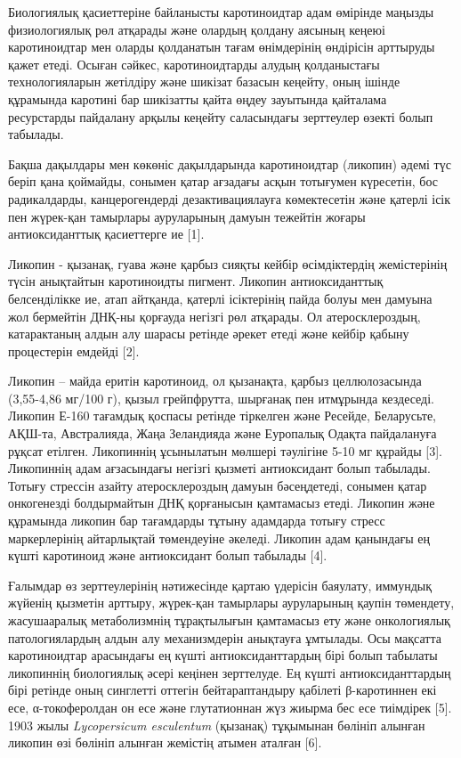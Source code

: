 Биологиялық қасиеттеріне байланысты каротиноидтар адам өмірінде маңызды
физиологиялық рөл атқарады және олардың қолдану аясының кеңеюі
каротиноидтар мен оларды қолданатын тағам өнімдерінің өндірісін
арттыруды қажет етеді. Осыған сәйкес, каротиноидтарды алудың
қолданыстағы технологияларын жетілдіру және шикізат базасын кеңейту,
оның ішінде құрамында каротині бар шикізатты қайта өңдеу зауытында
қайталама ресурстарды пайдалану арқылы кеңейту саласындағы зерттеулер
өзекті болып табылады.

Бақша дақылдары мен көкөніс дақылдарында каротиноидтар (ликопин) әдемі
түс беріп қана қоймайды, сонымен қатар ағзадағы асқын тотығумен
күресетін, бос радикалдарды, канцерогендерді дезактивациялауға
көмектесетін және қатерлі ісік пен жүрек-қан тамырлары ауруларының
дамуын тежейтін жоғары антиоксиданттық қасиеттерге ие {[}1{]}.

Ликопин - қызанақ, гуава және қарбыз сияқты кейбір өсімдіктердің
жемістерінің түсін анықтайтын каротиноидты пигмент. Ликопин
антиоксиданттық белсенділікке ие, атап айтқанда, қатерлі ісіктерінің
пайда болуы мен дамуына жол бермейтін ДНҚ-ны қорғауда негізгі рөл
атқарады. Ол атеросклероздың, катарактаның алдын алу шарасы ретінде
әрекет етеді және кейбір қабыну процестерін емдейді {[}2{]}.

Ликопин -- майда еритін каротиноид, ол қызанақта, қарбыз целлюлозасында
(3,55-4,86 мг/100 г), қызыл грейпфрутта, шырғанақ пен итмұрында
кездеседі. Ликопин Е-160 тағамдық қоспасы ретінде тіркелген және
Ресейде, Беларусьте, АҚШ-та, Австралияда, Жаңа Зеландияда және Еуропалық
Одақта пайдалануға рұқсат етілген. Ликопиннің ұсынылатын мөлшері
тәулігіне 5-10 мг құрайды {[}3{]}. Ликопиннің адам ағзасындағы негізгі
қызметі антиоксидант болып табылады. Тотығу стрессін азайту
атеросклероздың дамуын бәсеңдетеді, сонымен қатар онкогенезді
болдырмайтын ДНҚ қорғанысын қамтамасыз етеді. Ликопин және құрамында
ликопин бар тағамдарды тұтыну адамдарда тотығу стресс маркерлерінің
айтарлықтай төмендеуіне әкеледі. Ликопин адам қанындағы ең күшті
каротиноид және антиоксидант болып табылады {[}4{]}.

Ғалымдар өз зерттеулерінің нәтижесінде қартаю үдерісін баяулату,
иммундық жүйенің қызметін арттыру, жүрек-қан тамырлары ауруларының
қаупін төмендету, жасушааралық метаболизмнің тұрақтылығын қамтамасыз ету
және онкологиялық патологиялардың алдын алу механизмдерін анықтауға
ұмтылады. Осы мақсатта каротиноидтар арасындағы ең күшті
антиоксиданттардың бірі болып табылаты ликопиннің биологиялық әсері
кеңінен зерттелуде. Ең күшті антиоксиданттардың бірі ретінде оның
синглетті оттегін бейтараптандыру қабілеті β-каротиннен екі есе,
α-токоферолдан он есе және глутатионнан жүз жиырма бес есе тиімдірек
{[}5{]}. 1903 жылы \emph{Lycopersicum esculentum} (қызанақ) тұқымынан
бөлініп алынған ликопин өзі бөлініп алынған жемістің атымен аталған
{[}6{]}.

